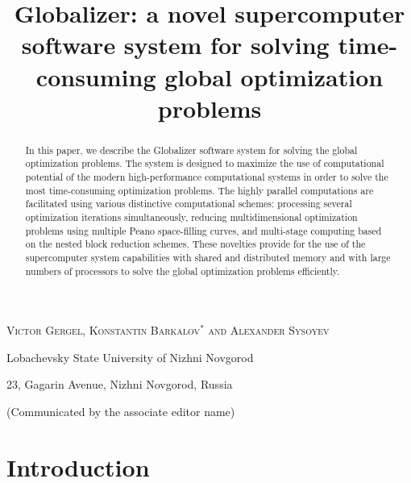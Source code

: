 \documentclass{aims}
\title[Globalizer: a supercomputer software] %
      {Globalizer: a novel supercomputer software system for solving time-consuming global optimization problems}
\author[V. P. Gergel, K. A. Barkalov and A. V. Sysoyev]{}
\theoremstyle{definition}
\begin{document}
\maketitle


\centerline{\scshape Victor Gergel, Konstantin  Barkalov$^*$ and Alexander Sysoyev}
\medskip
{\footnotesize
 \centerline{Lobachevsky State University of Nizhni Novgorod}
   \centerline{23, Gagarin Avenue, Nizhni Novgorod, Russia}
}

\bigskip

 \centerline{(Communicated by the associate editor name)}


\begin{abstract}
In this paper, we describe the Globalizer software system for solving the global
optimization problems. The system is designed to maximize the use of computational
potential of the modern high-performance computational systems in order to solve the
most time-consuming optimization problems. The highly parallel computations are facilitated
using various distinctive computational schemes: processing several optimization
iterations simultaneously, reducing multidimensional optimization problems using multiple
Peano space-filling curves, and multi-stage computing based on the nested block reduction schemes.
These novelties provide for the use of the supercomputer system capabilities with shared
and distributed memory and with large numbers of processors to solve the global
optimization problems efficiently.
\end{abstract}

\section{Introduction}\label{sec:intro}
\end{document}
